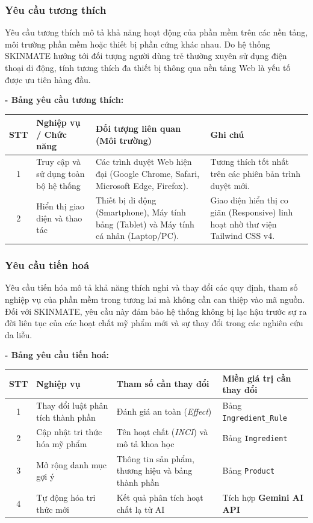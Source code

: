 \documentclass[12pt,a4paper]{article}
\begin{document}
\subsubsection{Yêu cầu tương thích}
Yêu cầu tương thích mô tả khả năng hoạt động của phần mềm trên các nền tảng, môi trường phần mềm hoặc thiết bị phần cứng khác nhau. Do hệ thống SKINMATE hướng tới đối tượng người dùng trẻ thường xuyên sử dụng điện thoại di động, tính tương thích đa thiết bị thông qua nền tảng Web là yếu tố được ưu tiên hàng đầu.

\textbf{- Bảng yêu cầu tương thích:}

\begin{center}
\begin{tabular}{|c|p{4cm}|p{5cm}|p{3.5cm}|}
\hline
\textbf{STT} & \textbf{Nghiệp vụ / Chức năng} & \textbf{Đối tượng liên quan (Môi trường)} & \textbf{Ghi chú} \\
\hline
1 & Truy cập và sử dụng toàn bộ hệ thống & Các trình duyệt Web hiện đại (Google Chrome, Safari, Microsoft Edge, Firefox). & Tương thích tốt nhất trên các phiên bản trình duyệt mới. \\
\hline
2 & Hiển thị giao diện và thao tác & Thiết bị di động (Smartphone), Máy tính bảng (Tablet) và Máy tính cá nhân (Laptop/PC). & Giao diện hiển thị co giãn (Responsive) linh hoạt nhờ thư viện Tailwind CSS v4. \\
\hline
\end{tabular}
\end{center}


\subsubsection{Yêu cầu tiến hoá}
Yêu cầu tiến hóa mô tả khả năng thích nghi và thay đổi các quy định, tham số nghiệp vụ của phần mềm trong tương lai mà không cần can thiệp vào mã nguồn. Đối với SKINMATE, yêu cầu này đảm bảo hệ thống không bị lạc hậu trước sự ra đời liên tục của các hoạt chất mỹ phẩm mới và sự thay đổi trong các nghiên cứu da liễu.

\textbf{- Bảng yêu cầu tiến hoá:}

\begin{center}
\renewcommand{\arraystretch}{1.3}
\begin{tabular}{|c|p{3.5cm}|p{4.5cm}|p{4cm}|}
\hline
\rowcolor{blue!10}
\textbf{STT} & \textbf{Nghiệp vụ} & \textbf{Tham số cần thay đổi} & \textbf{Miền giá trị cần thay đổi} \\
\hline
1 & Thay đổi luật phân tích thành phần & Đánh giá an toàn (\textit{Effect}) & Bảng \texttt{Ingredient\_Rule} \\
\hline
2 & Cập nhật tri thức hóa mỹ phẩm & Tên hoạt chất (\textit{INCI}) và mô tả khoa học & Bảng \texttt{Ingredient} \\
\hline
3 & Mở rộng danh mục gợi ý & Thông tin sản phẩm, thương hiệu và bảng thành phần & Bảng \texttt{Product} \\
\hline
4 & Tự động hóa tri thức mới & Kết quả phân tích hoạt chất lạ từ AI & Tích hợp \textbf{Gemini AI API} \\
\hline
\end{tabular}
\end{center}
\end{document}

